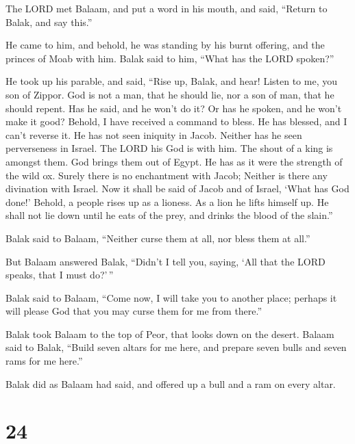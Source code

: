  The LORD met Balaam, and put a word in his mouth, and
said, ``Return to Balak, and say this.''

 He came to him, and behold, he was standing by his burnt
offering, and the princes of Moab with him. Balak said to him, ``What
has the LORD spoken?''

 He took up his parable, and said, ``Rise up, Balak, and
hear! Listen to me, you son of Zippor.  God is not a man,
that he should lie, nor a son of man, that he should repent. Has he
said, and he won't do it? Or has he spoken, and he won't make it good?
 Behold, I have received a command to bless. He has
blessed, and I can't reverse it.  He has not seen
iniquity in Jacob. Neither has he seen perverseness in Israel. The LORD
his God is with him. The shout of a king is amongst them.
 God brings them out of Egypt. He has as it were the
strength of the wild ox.  Surely there is no enchantment
with Jacob; Neither is there any divination with Israel. Now it shall be
said of Jacob and of Israel, `What has God done!' 
Behold, a people rises up as a lioness. As a lion he lifts himself up.
He shall not lie down until he eats of the prey, and drinks the blood of
the slain.''

 Balak said to Balaam, ``Neither curse them at all, nor
bless them at all.''

 But Balaam answered Balak, ``Didn't I tell you, saying,
`All that the LORD speaks, that I must do?'\,''

 Balak said to Balaam, ``Come now, I will take you to
another place; perhaps it will please God that you may curse them for me
from there.''

 Balak took Balaam to the top of Peor, that looks down on
the desert.  Balaam said to Balak, ``Build seven altars
for me here, and prepare seven bulls and seven rams for me here.''

 Balak did as Balaam had said, and offered up a bull and
a ram on every altar.

\hypertarget{section-23}{%
\section{24}\label{section-23}}

